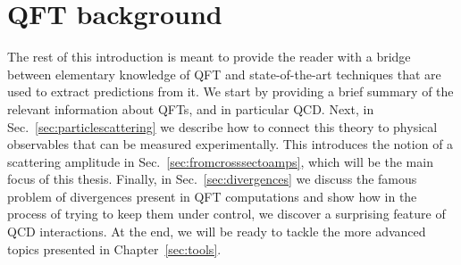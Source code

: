 \documentclass[main.tex]{subfiles}
\begin{document}
\section{QFT background}
The rest of this introduction is meant to provide the reader with a bridge between elementary knowledge of QFT and state-of-the-art techniques that are used to extract predictions from it. We start by providing a brief summary of the relevant information about QFTs, and in particular QCD. Next, in Sec.~\ref{sec:particlescattering} we describe how to connect this theory to physical observables that can be measured experimentally. This introduces the notion of a scattering amplitude in Sec.~\ref{sec:fromcrosssectoamps}, which will be the main focus of this thesis. Finally, in Sec.~\ref{sec:divergences} we discuss the famous problem of divergences present in QFT computations and show how in the process of trying to keep them under control, we discover a surprising feature of QCD interactions. At the end, we will be ready to tackle the more advanced topics presented in Chapter~\ref{sec:tools}.
\end{document}
